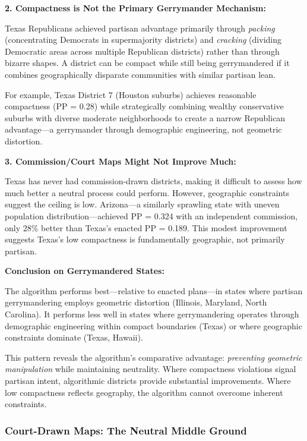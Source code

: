 \textbf{2. Compactness is Not the Primary Gerrymander Mechanism:}

Texas Republicans achieved partisan advantage primarily through \textit{packing} (concentrating Democrats in supermajority districts) and \textit{cracking} (dividing Democratic areas across multiple Republican districts) rather than through bizarre shapes. A district can be compact while still being gerrymandered if it combines geographically disparate communities with similar partisan lean.

For example, Texas District 7 (Houston suburbs) achieves reasonable compactness (PP = 0.28) while strategically combining wealthy conservative suburbs with diverse moderate neighborhoods to create a narrow Republican advantage—a gerrymander through demographic engineering, not geometric distortion.

\textbf{3. Commission/Court Maps Might Not Improve Much:}

Texas has never had commission-drawn districts, making it difficult to assess how much better a neutral process could perform. However, geographic constraints suggest the ceiling is low. Arizona—a similarly sprawling state with uneven population distribution—achieved PP = 0.324 with an independent commission, only 28\% better than Texas's enacted PP = 0.189. This modest improvement suggests Texas's low compactness is fundamentally geographic, not primarily partisan.

\textbf{Conclusion on Gerrymandered States:}

The algorithm performs best—relative to enacted plans—in states where partisan gerrymandering employs geometric distortion (Illinois, Maryland, North Carolina). It performs less well in states where gerrymandering operates through demographic engineering within compact boundaries (Texas) or where geographic constraints dominate (Texas, Hawaii).

This pattern reveals the algorithm's comparative advantage: \textit{preventing geometric manipulation} while maintaining neutrality. Where compactness violations signal partisan intent, algorithmic districts provide substantial improvements. Where low compactness reflects geography, the algorithm cannot overcome inherent constraints.

\subsubsection{Court-Drawn Maps: The Neutral Middle Ground}

